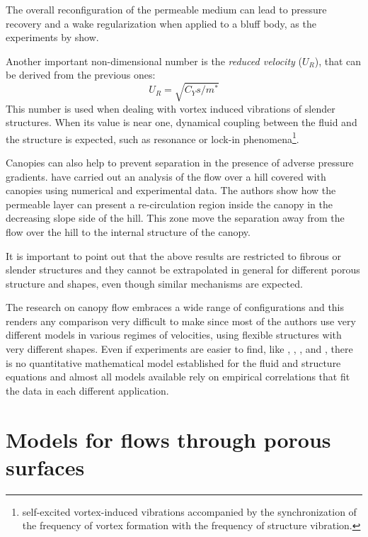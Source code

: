 The overall reconfiguration of the permeable medium can lead to pressure recovery and a wake regularization when applied to a bluff body, as the experiments by \citet{gosselin2011drag} show.

Another important non-dimensional number is the \textit{reduced velocity} ($U_R$), that can be derived from the previous ones:
$$ U_R = \sqrt{C_Y s / m^*}$$
This number is used when dealing with vortex induced vibrations of slender structures. When its value is near one, dynamical coupling between the fluid and the structure is expected, such as resonance or lock-in phenomena\footnote{self-excited vortex-induced vibrations accompanied by the synchronization of the frequency of vortex formation with the frequency of structure vibration.}.

Canopies can also help to prevent separation in the presence of adverse pressure gradients. \citet{belcher2012wind} have carried out an analysis of the flow over a hill covered with canopies using numerical and experimental data. The authors show how the permeable layer can present a re-circulation region inside the canopy in the decreasing slope side of the hill. This zone move the separation away from the flow over the hill to the internal structure of the canopy.

It is important to point out that the above results are restricted to fibrous or slender structures and they cannot be extrapolated in general for different porous structure and shapes, even though similar mechanisms are expected.

The research on canopy flow embraces a wide range of configurations and this renders any comparison very difficult to make since most of the authors use very different models in various regimes of velocities, using flexible structures with very different shapes.
Even if experiments are easier to find, like \citet{segalini2011experimental}, \citet{segalini2013scaling}, \citet{maza2013coupled}, \citet{barsu2016drag} and \citet{alvarado2017nature}, there is no quantitative mathematical model established for the fluid and structure equations and almost all models available rely on empirical correlations that fit the data in each different application.


\section{Models for flows through porous surfaces}
\label{ch:model_porous}

